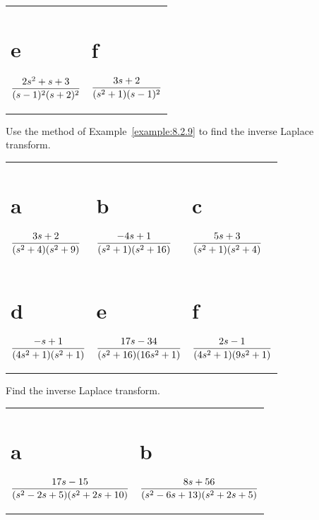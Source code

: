 \begin{exerciselist}
\begin{tabular}[t]{@{}p{168pt}@{}p{168pt}}
    \part{e} $\displaystyle\frac{2s^{2}+s+3}{(s-1)^{2}(s+2)^{2}}$ & \part{f} $\displaystyle\frac{3s+2}{(s^{2}+1)(s-1)^{2}}$
  \end{tabular}

  \item\label{exer:8.2.5} Use the method of Example~\ref{example:8.2.9} to find the inverse Laplace
        transform.

  \begin{tabular}[t]{@{}p{112pt}@{}p{112pt}@{}p{112pt}}
    \part{a} $\displaystyle\frac{3s+2}{(s^{2}+4)(s^{2}+9)}$  & \part{b} $\displaystyle\frac{-4s+1}{(s^{2}+1)(s^{2}+16)}$    & \part{c} $\displaystyle\frac{5s+3}{(s^{2}+1)(s^{2}+4)}$   \\[10pt]
    \part{d} $\displaystyle\frac{-s+1}{(4s^{2}+1)(s^{2}+1)}$ & \part{e} $\displaystyle\frac{17s-34}{(s^{2}+16)(16s^{2}+1)}$ & \part{f} $\displaystyle\frac{2s-1}{(4s^{2}+1)(9s^{2}+1)}$
  \end{tabular}

  \item\label{exer:8.2.6} Find the inverse Laplace transform.

  \begin{tabular}[t]{@{}p{168pt}@{}p{168pt}}
    \part{a} $\displaystyle\frac{17s-15}{(s^{2}-2s+5)(s^{2}+2s+10)}$ & \part{b} $\displaystyle\frac{8s+56}{(s^{2}-6s+13)(s^{2}+2s+5)}$   \\[10pt]

\end{tabular}
\end{exerciselist}
